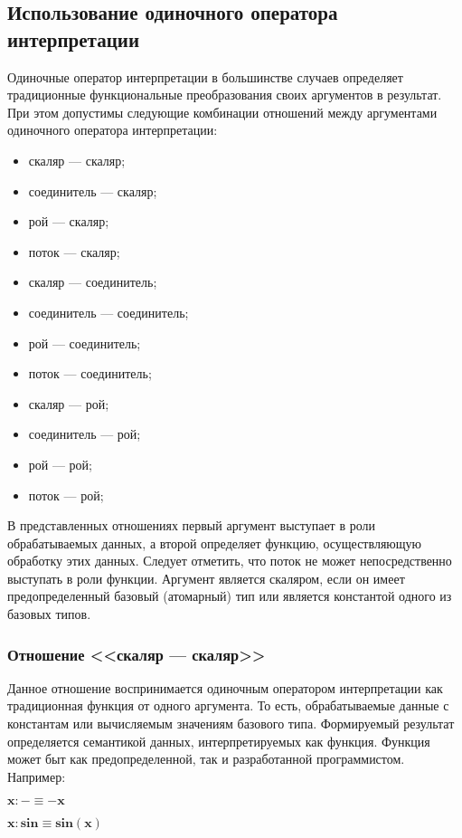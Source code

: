 \subsection{Использование одиночного оператора интерпретации}

Одиночные оператор интерпретации в большинстве случаев определяет традиционные функциональные преобразования своих аргументов в результат. При этом допустимы следующие комбинации отношений между аргументами одиночного оператора интерпретации:
\begin{itemize}
	\item скаляр --- скаляр;
	\item соединитель --- скаляр;
	\item рой --- скаляр;
	\item поток --- скаляр;
	\item скаляр --- соединитель;
	\item соединитель --- соединитель;
	\item рой --- соединитель;
	\item поток --- соединитель;
	\item скаляр --- рой;
	\item соединитель --- рой;
	\item рой --- рой;
	\item поток --- рой;
\end{itemize}
В представленных отношениях первый аргумент выступает в роли обрабатываемых данных, а второй определяет функцию, осуществляющую обработку этих данных. Следует отметить, что поток не может непосредственно выступать в роли функции. Аргумент является скаляром, если он имеет предопределенный базовый (атомарный) тип или является константой одного из базовых типов.

\subsubsection{Отношение <<скаляр --- скаляр>>}

Данное отношение воспринимается одиночным оператором интерпретации как традиционная функция от одного аргумента. То есть, обрабатываемые данные с константам или вычисляемым значениям базового типа. Формируемый результат определяется семантикой данных, интерпретируемых как функция. Функция может быт как предопределенной, так и разработанной программистом. Например:
\begin{center}
	$\mathbf{x:- \equiv -x}$
	
	$\mathbf{x:sin \equiv sin(x)}$
\end{center}


